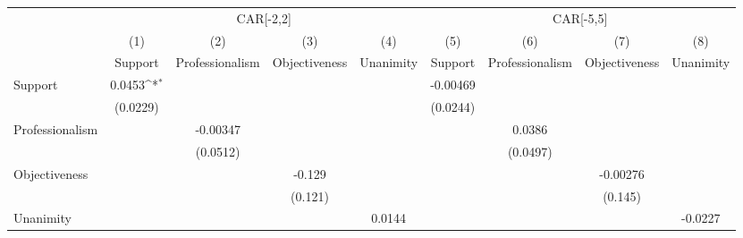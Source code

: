 {
\def\sym#1{\ifmmode^{#1}\else\(^{#1}\)\fi}
\begin{tabular}{l*{8}{c}}
\hline\hline
                    &\multicolumn{4}{c}{CAR[-2,2]}                                                          &\multicolumn{4}{c}{CAR[-5,5]}                                                          \\
                    &\multicolumn{1}{c}{(1)}&\multicolumn{1}{c}{(2)}&\multicolumn{1}{c}{(3)}&\multicolumn{1}{c}{(4)}&\multicolumn{1}{c}{(5)}&\multicolumn{1}{c}{(6)}&\multicolumn{1}{c}{(7)}&\multicolumn{1}{c}{(8)}\\
                    &\multicolumn{1}{c}{Support}&\multicolumn{1}{c}{Professionalism}&\multicolumn{1}{c}{Objectiveness}&\multicolumn{1}{c}{Unanimity}&\multicolumn{1}{c}{Support}&\multicolumn{1}{c}{Professionalism}&\multicolumn{1}{c}{Objectiveness}&\multicolumn{1}{c}{Unanimity}\\
\hline
Support             &      0.0453\sym{*}  &                     &                     &                     &    -0.00469         &                     &                     &                     \\
                    &    (0.0229)         &                     &                     &                     &    (0.0244)         &                     &                     &                     \\
Professionalism     &                     &    -0.00347         &                     &                     &                     &      0.0386         &                     &                     \\
                    &                     &    (0.0512)         &                     &                     &                     &    (0.0497)         &                     &                     \\
Objectiveness       &                     &                     &      -0.129         &                     &                     &                     &    -0.00276         &                     \\
                    &                     &                     &     (0.121)         &                     &                     &                     &     (0.145)         &                     \\
Unanimity           &                     &                     &                     &      0.0144         &                     &                     &                     &     -0.0227         \\

\end{tabular}}
